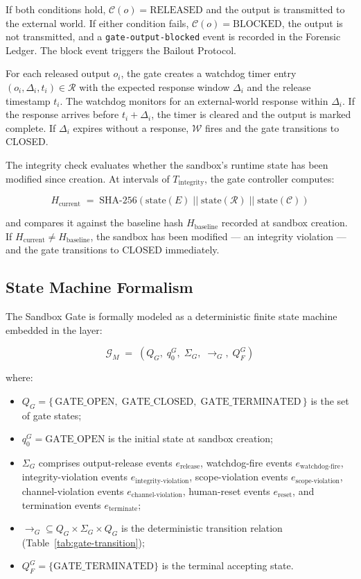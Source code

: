 If both conditions hold, $\mathcal{C}(o) = \text{RELEASED}$ and the output is transmitted to the external world. If either condition fails, $\mathcal{C}(o) = \text{BLOCKED}$, the output is not transmitted, and a \texttt{gate-output-blocked} event is recorded in the Forensic Ledger. The block event triggers the Bailout Protocol.

For each released output $o_i$, the gate creates a watchdog timer entry $(o_i, \Delta_i, t_i) \in \mathcal{R}$ with the expected response window $\Delta_i$ and the release timestamp $t_i$. The watchdog monitors for an external-world response within $\Delta_i$. If the response arrives before $t_i + \Delta_i$, the timer is cleared and the output is marked complete. If $\Delta_i$ expires without a response, $\mathcal{W}$ fires and the gate transitions to CLOSED.

The integrity check evaluates whether the sandbox's runtime state has been modified since creation. At intervals of $T_{\text{integrity}}$, the gate controller computes:

\begin{equation}
H_{\text{current}} \;=\; \text{SHA-256}(\text{state}(E) \;||\; \text{state}(\mathcal{R}) \;||\; \text{state}(\mathcal{C}))
\end{equation}

and compares it against the baseline hash $H_{\text{baseline}}$ recorded at sandbox creation. If $H_{\text{current}} \neq H_{\text{baseline}}$, the sandbox has been modified — an integrity violation — and the gate transitions to CLOSED immediately.

\subsection{State Machine Formalism}\label{sec:gate-state-machine}

The Sandbox Gate is formally modeled as a deterministic finite state machine embedded in the \fact{} layer:

\[
\mathcal{G}_M \;=\; (Q_G,\; q_0^G,\; \Sigma_G,\; \rightarrow_G,\; Q_F^G)
\]

where:

\begin{itemize}\itemsep=0pt
\item $Q_G = \{\,\text{GATE\_OPEN},\; \text{GATE\_CLOSED},\; \text{GATE\_TERMINATED}\,\}$ is the set of gate states;
\item $q_0^G = \text{GATE\_OPEN}$ is the initial state at sandbox creation;
\item $\Sigma_G$ comprises output-release events $e_{\text{release}}$, watchdog-fire events $e_{\text{watchdog-fire}}$, integrity-violation events $e_{\text{integrity-violation}}$, scope-violation events $e_{\text{scope-violation}}$, channel-violation events $e_{\text{channel-violation}}$, human-reset events $e_{\text{reset}}$, and termination events $e_{\text{terminate}}$;
\item $\rightarrow_G \subseteq Q_G \times \Sigma_G \times Q_G$ is the deterministic transition relation (Table~\ref{tab:gate-transition});
\item $Q_F^G = \{\text{GATE\_TERMINATED}\}$ is the terminal accepting state.
\end{itemize}

